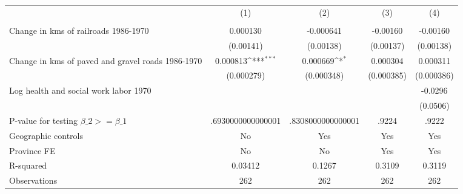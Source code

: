 {
\def\sym#1{\ifmmode^{#1}\else\(^{#1}\)\fi}
\begin{tabular}{l*{4}{c}}
\hline\hline
                &\multicolumn{1}{c}{(1)}&\multicolumn{1}{c}{(2)}&\multicolumn{1}{c}{(3)}&\multicolumn{1}{c}{(4)}\\
                &\multicolumn{1}{c}{}&\multicolumn{1}{c}{}&\multicolumn{1}{c}{}&\multicolumn{1}{c}{}\\
\hline
Change in kms of railroads 1986-1970& 0.000130         &-0.000641         & -0.00160         & -0.00160         \\
                &(0.00141)         &(0.00138)         &(0.00137)         &(0.00138)         \\
[1em]
Change in kms of paved and gravel roads 1986-1970& 0.000813\sym{***}& 0.000669\sym{*}  & 0.000304         & 0.000311         \\
                &(0.000279)         &(0.000348)         &(0.000385)         &(0.000386)         \\
[1em]
Log health and social work labor 1970&                  &                  &                  &  -0.0296         \\
                &                  &                  &                  & (0.0506)         \\
\hline
P-value for testing $\beta\_{2} >= \beta\_{1}$&.6930000000000001         &.8308000000000001         &    .9224         &    .9222         \\
Geographic controls&       No         &      Yes         &      Yes         &      Yes         \\
Province FE     &       No         &       No         &      Yes         &      Yes         \\
R-squared       &  0.03412         &   0.1267         &   0.3109         &   0.3119         \\
Observations    &      262         &      262         &      262         &      262         \\
\hline\hline
\end{tabular}
}
